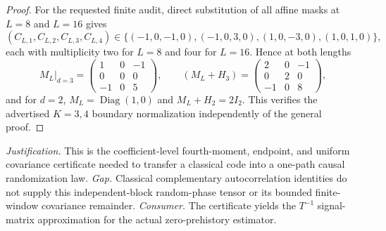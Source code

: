 \documentclass{article}
\begin{document}
\begin{proof}
For the requested finite audit, direct substitution of all affine masks at \(L=8\) and \(L=16\) gives
\[
(C_{L,1},C_{L,2},C_{L,3},C_{L,4})
\in\{(-1,0,-1,0),(-1,0,3,0),(1,0,-3,0),(1,0,1,0)\}, \tag{11}
\]
each with multiplicity two for \(L=8\) and four for \(L=16\).  Hence at both lengths
\[
M_L\big|_{d=3}=\begin{pmatrix}1&0&-1\\0&0&0\\-1&0&5\end{pmatrix},
\qquad
(M_L+H_3)=\begin{pmatrix}2&0&-1\\0&2&0\\-1&0&8\end{pmatrix}, \tag{12}
\]
and for \(d=2\), \(M_L=\operatorname{Diag}(1,0)\) and \(M_L+H_2=2I_2\).  This verifies the advertised \(K=3,4\) boundary normalization independently of the general proof.
\end{proof}
\par\smallskip\noindent \textit{Justification.} This is the coefficient-level fourth-moment, endpoint, and uniform covariance certificate needed to transfer a classical code into a one-path causal randomization law. \textit{Gap.} Classical complementary autocorrelation identities do not supply this independent-block random-phase tensor or its bounded finite-window covariance remainder. \textit{Consumer.} The certificate yields the \(T^{-1}\) signal-matrix approximation for the actual zero-prehistory estimator.
\end{document}
